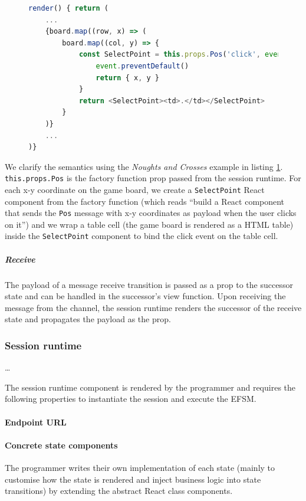 \documentclass[submission,copyright,creativecommons]{eptcs}
\begin{document}
\begin{figure}[!h]
\begin{lstlisting}[language=JavaScript, tabsize=4]
render() { return (
	...
	{board.map((row, x) => (
		board.map((col, y) => {
			const SelectPoint = this.props.Pos('click', event => {
				event.preventDefault()
				return { x, y }
			}
			return <SelectPoint><td>.</td></SelectPoint>
		}
	)}
	...	
)}
\end{lstlisting}  
\label{lst:clientapp}
\end{figure}

We clarify the semantics using the \textit{Noughts and Crosses} example in listing \ref{lst:clientapp}. \texttt{this.props.Pos} is the factory function prop passed from the session runtime. For each x-y coordinate on the game board, we create a \texttt{SelectPoint} React component from the factory function (which reads ``build a React component that sends the \texttt{Pos} message with x-y coordinates as payload when the user clicks on it'') and we wrap a table cell (the game board is rendered as a HTML table) inside the \texttt{SelectPoint} component to bind the click event on the table cell.

\subparagraph{Receive} The payload of a message receive transition is passed as a prop to the successor state and can be handled in the successor's view function. Upon receiving the message from the channel, the session runtime renders the successor of the receive state and propagates the payload as the prop.

\subsubsection{Session runtime}
\label{section:clientruntime}

\dots

The session runtime component is rendered by the programmer and requires the following properties to instantiate the session and execute the EFSM.

\paragraph{Endpoint URL}

\paragraph{Concrete state components} The programmer writes their own implementation of each state (mainly to customise how the state is rendered and inject business logic into state transitions) by extending the abstract React class components.
\end{document}

